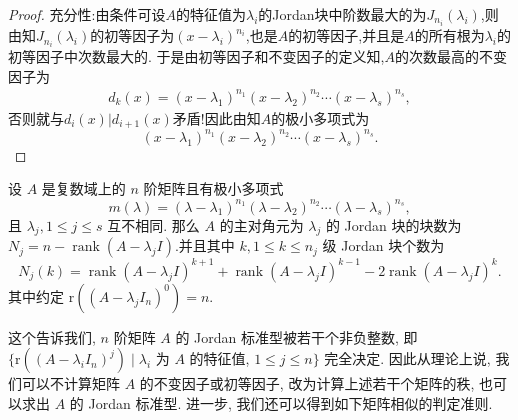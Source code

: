 \documentclass[../../main.tex]{subfiles}%
\begin{document}
\begin{proof}
{\heiti 充分性:}由条件可设$A$的特征值为$\lambda_i$的Jordan块中阶数最大的为$J_{n_i}(\lambda_i)$,则由知$J_{n_i}(\lambda_i)$的初等因子为$(x-\lambda_i)^{n_i}$,也是$A$的初等因子,并且是$A$的所有根为$\lambda_i$的初等因子中次数最大的.
于是由初等因子和不变因子的定义知,$A$的次数最高的不变因子为
\begin{align*}
d_k(x)=(x-\lambda_1)^{n_1}(x-\lambda_2)^{n_2}\cdots(x-\lambda_s)^{n_s},
\end{align*}
否则就与$d_i(x)|d_{i+1}(x)$矛盾!因此由知$A$的极小多项式为
$$(x-\lambda_1)^{n_1}(x-\lambda_2)^{n_2}\cdots(x-\lambda_s)^{n_s}.$$

\end{proof}


\begin{theorem}[Jordan标准型的计算]\label{theorem:Jordan块的个数与秩的关系}
设 \( A \) 是复数域上的 \( n \) 阶矩阵且有极小多项式  
\[ m(\lambda) = (\lambda - \lambda_1)^{n_1} (\lambda - \lambda_2)^{n_2} \cdots (\lambda - \lambda_s)^{n_s}, \]  
且 \( \lambda_j, 1 \leqslant j \leqslant s \) 互不相同. 那么 \( A \) 的主对角元为 \( \lambda_j \) 的 Jordan 块的块数为 \( N_j = n - \operatorname{rank}(A - \lambda_j I) \).并且其中 \( k, 1 \leqslant k \leqslant n_j \) 级 Jordan 块个数为  
\[ N_j(k) = \operatorname{rank}(A - \lambda_j I)^{k+1} + \operatorname{rank}(A - \lambda_j I)^{k-1} - 2\operatorname{rank}(A - \lambda_j I)^k. \]
其中约定 $\mathrm{r}((A - \lambda_j I_n)^0) = n$.
\end{theorem}
\begin{remark}
这个告诉我们, $n$ 阶矩阵 $A$ 的 Jordan 标准型被若干个非负整数, 即 $\{\mathrm{r}((A - \lambda_i I_n)^j) \mid \lambda_i$ 为 $A$ 的特征值, $1 \leqslant  j \leqslant  n\}$ 完全决定. 因此从理论上说, 我们可以不计算矩阵 $A$ 的不变因子或初等因子, 改为计算上述若干个矩阵的秩, 也可以求出 $A$ 的 Jordan 标准型. 进一步, 我们还可以得到如下矩阵相似的判定准则.
\end{remark}
\end{document}
